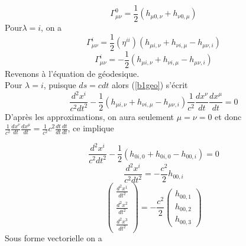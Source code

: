 \documentclass[a4paper,12pt]{report}
\theoremstyle{plain}
\theoremstyle{plain}
\begin{document}
\begin{equation}\label{b1gamo}
 \Gamma^0_{\mu\nu}=\frac{1}{2}(h_{\mu0, \nu}+h_{\nu0, \mu}) 
\end{equation}
Pour$\lambda=i$,   on a
\begin{equation}
 \Gamma^i_{\mu\nu}=\frac{1}{2}( \eta^{ii})(h_{\mu i, \nu}+h_{\nu i, \mu} -h_{\mu\nu, i}) 
\end{equation}
\begin{equation}
 \Gamma^i_{\mu\nu}=-\frac{1}{2}(h_{\mu i, \nu}+h_{\nu i, \mu} -h_{\mu\nu, i}) 
\end{equation}
Revenons \`a l'\'equation de g\'eodesique.  \\
% 


 Pour $\lambda=i$,  puisque $ds=cdt $  alors (\ref{b1geo}) s'\'ecrit
\begin{equation}
 \frac{d^2x^i}{c^2dt^2}-\frac{1}{2}(h_{\mu i, \nu}+h_{\nu i, \mu} -h_{\mu\nu, i})\frac{1}{c^2}\frac{dx^\nu}{dt}\frac{dx^\mu}{dt}=0 
\end{equation}
D'apr\`es les approximations, on aura seulement $\mu=\nu=0 $ et donc$\frac{1}{c^2}\frac{dx^\nu}{dt}\frac{dx^\mu}{dt}=\frac{1}{c^2}c^2\frac{dt}{dt}\frac{dt}{dt}$, 
ce implique  

\begin{equation}
 \frac{d^2x^i}{c^2dt^2}-\frac{1}{2}(h_{0 i, 0}+h_{0 i, 0} -h_{00, i})=0 
\end{equation}
\begin{equation}
 \frac{d^2x^i}{c^2dt^2}=-\frac{c^2}{2}h_{00, i}
\end{equation}
\begin{equation}
 \begin{pmatrix}  \frac{d^2x^1}{dt^2} \\  \frac{d^2x^2}{dt^2}\\  \frac{d^2x^3}{dt^2}\end{pmatrix}= 
 -\frac{c^2}{2} \begin{pmatrix}  h_{00, 1} \\ h_{00, 2} \\ h_{00, 3} \end{pmatrix}
\end{equation}
Sous forme vectorielle on a 
\end{document}
